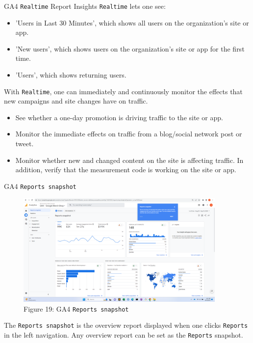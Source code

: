 \documentclass[pdf]{beamer}
\theoremstyle{remark}
\theoremstyle{definition}
\begin{document}
\begin{frame}[t]{GA4 \texttt{Realtime} Report Insights}
\small
\texttt{Realtime} lets one see: \\
\begin{itemize}
\item 'Users in Last 30 Minutes', which shows all users on the organization's site or app.
\item 'New users', which shows users on the organization's site or app for the first time.
\item 'Users', which shows returning users.
\end{itemize}
With \texttt{Realtime}, one can immediately and continuously monitor the effects that new campaigns and site changes have on traffic. \\
\begin{itemize}
\item See whether a one-day promotion is driving traffic to the site or app.
\item Monitor the immediate effects on traffic from a blog/social network post or tweet.
\item Monitor whether new and changed content on the site is affecting traffic.  In addition, verify that the measurement code is working on the site or app.
\end{itemize}
\end{frame}

\begin{frame}[t]{GA4 \texttt{Reports snapshot}}
\begin{figure}[htbp]
  \captionsetup{justification=centering}
  \includegraphics[height=5.6cm, trim=1.5cm 0.0cm 2.0cm 0.0cm width=5.6cm]{Images/G4A_6b_091923_Reports_Snapshot.png}
  \caption{Figure {\color{franklinblue} 19}: GA4 \texttt{Reports snapshot}}
\end{figure}
\vspace{-2.0ex}
\small 
The \texttt{Reports snapshot} is the overview report displayed when one clicks \texttt{Reports} in the left navigation. Any overview report can be set as the \texttt{Reports} snapshot.
\end{frame}
\end{document}
